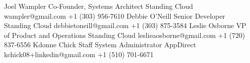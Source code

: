 
\begin{referees}
		{Joel Wampler}
		{Co-Founder, Systems Architect}
		{Standing Cloud}
		{wampler@gmail.com}
    {+1 (303) 956-7610}
  \newline
    {Debbie O'Neill}
    {Senior Developer}
    {Standing Cloud}
    {debbietoneill@gmail.com}
    {+1 (303) 875-3584}
  \newline
    {Leslie Osborne}
    {VP of Product and Operations}
    {Standing Cloud}
    {leslieaosborne@gmail.com}
    {+1 (720) 837-6556}
  \newline
    {Kdonne Chick}
    {Staff System Administrator}
    {AppDirect}
    {kchick08+linkedin@gmail.com}
    {+1 (510) 701-6671}
\end{referees}
